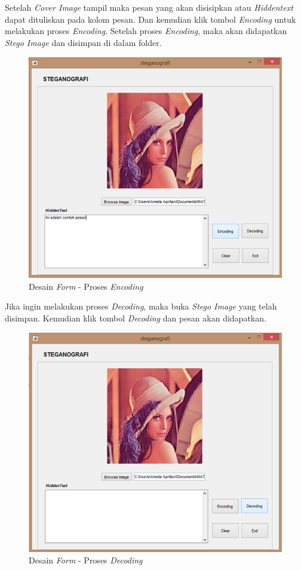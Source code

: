 	Setelah \emph{Cover Image} tampil maka pesan yang akan disisipkan atau \emph{Hiddentext} dapat dituliskan pada kolom pesan. Dan kemudian klik tombol \emph{Encoding} untuk melakukan proses \emph{Encoding}. Setelah proses \emph{Encoding}, maka akan didapatkan \emph{Stego Image} dan disimpan di dalam folder.
	
	\begin{figure}[H]
		\centering
		\includegraphics[width=1\textwidth]{gambar/mockup/3}
		\caption{Desain \emph{Form} - Proses \emph{Encoding}}
		\label{desain_encoding}
	\end{figure}

	Jika ingin melakukan proses \emph{Decoding}, maka buka \emph{Stego Image} yang telah disimpan. Kemudian klik tombol \emph{Decoding} dan pesan akan didapatkan.
	
	\begin{figure}[H]
		\centering
		\includegraphics[width=1\textwidth]{gambar/mockup/4}
		\caption{Desain \emph{Form} - Proses \emph{Decoding}}
		\label{desain_decoding}
	\end{figure}

